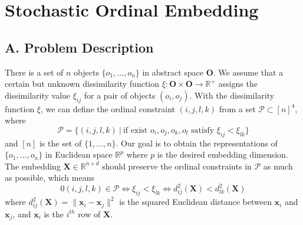 \documentclass[letterpaper]{article} %
\begin{document}


\section{Stochastic Ordinal Embedding}

\subsection{A. Problem Description}

 There is a set of $n$ objects $\{o_1,\dots,o_n\}$ in abstract space $\mathbf{O}$. We assume that a certain but unknown dissimilarity function $\xi:\mathbf{O}\times\mathbf{O}\rightarrow\mathbb{R}^{+}$ assigns the dissimilarity value $\xi_{ij}$ for a pair of objects $(o_i,o_j)$. With the dissimilarity function $\xi$, we can define the ordinal constraint $(i,j,l,k)$ from a set $\mathcal{P}\subset[n]^4$, where
$$
	\mathcal{P}=\{(i,j,l,k)\ |\ \text{if exist }o_i,o_j,o_k,o_l\text{ satisfy }\xi_{ij}<\xi_{lk}\}
$$
and $[n]$ is the set of $\{1,\dots,n\}$. Our goal is to obtain the representations of $\{o_1,\dots,o_n\}$ in Euclidean space $\mathbb{R}^{p}$ where $p$ is the desired embedding dimension. The embedding $\mathbf{X}\in\mathbb{R}^{n\times d}$ should preserve the ordinal constraints in $\mathcal{P}$ as much as possible, which means
$$0
	(i,j,l,k)\in\mathcal{P} \Leftrightarrow \xi_{ij} < \xi_{lk} \Leftrightarrow d^2_{ij}(\mathbf{X}) < d^2_{lk}(\mathbf{X})
$$
where $d^2_{ij}(\mathbf{X})=\|\mathbf{x}_i-\mathbf{x}_j\|^2$ is the squared Euclidean distance between $\mathbf{x}_i$ and $\mathbf{x}_j$, and $\mathbf{x}_i$ is the $i^{th}$ row of $\mathbf{X}$.
	
\end{document}
